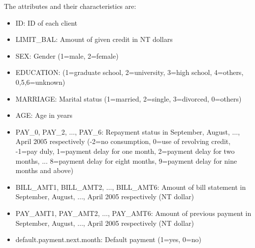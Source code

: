 \documentclass[fleqn,10pt]{SelfArx} %
\begin{document}
	The attributes and their characteristics are:
	\begin{itemize}[noitemsep]
		\item ID: ID of each client
		\item LIMIT\_BAL: Amount of given credit in NT dollars
		\item SEX: Gender (1=male, 2=female)
		\item EDUCATION: (1=graduate school, 2=university, 3=high school, 4=others, 0,5,6=unknown)
		\item MARRIAGE: Marital status (1=married, 2=single, 3=divorced, 0=others)
		\item AGE: Age in years
		\item PAY\_0, PAY\_2, $\hdots$, PAY\_6: Repayment status in September, August, $\hdots$, April 2005 respectively (-2=no consumption, 0=use of revolving credit, -1=pay duly, 1=payment delay for one month, 2=payment delay for two months, ... 8=payment delay for eight months, 9=payment delay for nine months and above)
		\item BILL\_AMT1, BILL\_AMT2, $\hdots$,  BILL\_AMT6: Amount of bill statement in September, August, $\hdots$, April 2005 respectively (NT dollar)
		\item PAY\_AMT1, PAY\_AMT2, $\hdots$, PAY\_AMT6: Amount of previous payment in September, August, $\hdots$, April 2005 respectively (NT dollar)
		\item default.payment.next.month: Default payment (1=yes, 0=no)
	\end{itemize}
	
\end{document}
